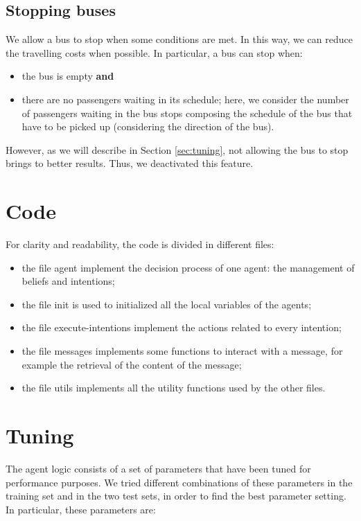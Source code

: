 \documentclass{article}
\begin{document}
\subsection{Stopping buses}
\label{sec:stop}
We allow a bus to stop when some conditions are met. In this way, we can reduce the travelling costs when possible. In particular, a bus can stop when:

\begin{itemize}
\item the bus is empty \textbf{and}
\item there are no passengers waiting in its schedule; here, we consider the number of passengers waiting in the bus stops composing the schedule of the bus that have to be picked up (considering the direction of the bus).
\end{itemize}

However, as we will describe in Section \ref{sec:tuning}, not allowing the bus to stop brings to better results. Thus, we deactivated this feature.

\section{Code}
For clarity and readability, the code is divided in different files:

\begin{itemize}
\item the file agent implement the decision process of one agent: the management of beliefs and intentions;
\item the file init is used to initialized all the local variables of the agents;
\item the file execute-intentions implement the actions related to every intention;
\item the file messages implements some functions to interact with a message, for example the retrieval of the content of the message;
\item the file utils implements all the utility functions used by the other files.
\end{itemize} 

\section{Tuning}
The agent logic consists of a set of parameters that have been tuned for performance purposes. We tried different combinations of these parameters in the training set and in the two test sets, in order to find the best parameter setting. In particular, these parameters are:
\end{document}
